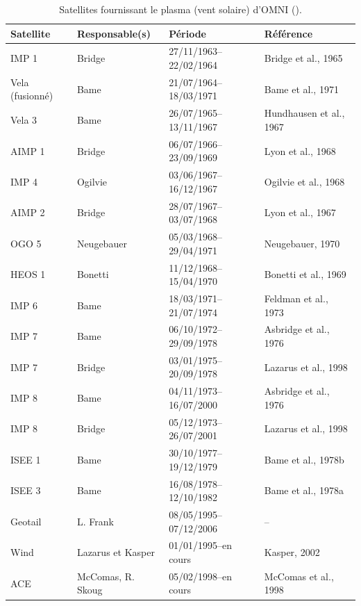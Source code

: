 \begin{table}[ht]
\centering
\footnotesize
\setlength{\tabcolsep}{4pt}
\begin{tabular}{llll}
\hline
\textbf{Satellite} & \textbf{Responsable(s)} & \textbf{Période} & \textbf{Référence} \\
\hline
IMP 1 & Bridge & 27/11/1963--22/02/1964 & Bridge et al., 1965 \\
Vela (fusionné) & Bame & 21/07/1964--18/03/1971 & Bame et al., 1971 \\
Vela 3 & Bame & 26/07/1965--13/11/1967 & Hundhausen et al., 1967 \\
AIMP 1 & Bridge & 06/07/1966--23/09/1969 & Lyon et al., 1968 \\
IMP 4 & Ogilvie & 03/06/1967--16/12/1967 & Ogilvie et al., 1968 \\
AIMP 2 & Bridge & 28/07/1967--03/07/1968 & Lyon et al., 1967 \\
OGO 5 & Neugebauer & 05/03/1968--29/04/1971 & Neugebauer, 1970 \\
HEOS 1 & Bonetti & 11/12/1968--15/04/1970 & Bonetti et al., 1969 \\
IMP 6 & Bame & 18/03/1971--21/07/1974 & Feldman et al., 1973 \\
IMP 7 & Bame & 06/10/1972--29/09/1978 & Asbridge et al., 1976 \\
IMP 7 & Bridge & 03/01/1975--20/09/1978 & Lazarus et al., 1998 \\
IMP 8 & Bame & 04/11/1973--16/07/2000 & Asbridge et al., 1976 \\
IMP 8 & Bridge & 05/12/1973--26/07/2001 & Lazarus et al., 1998 \\
ISEE 1 & Bame & 30/10/1977--19/12/1979 & Bame et al., 1978b \\
ISEE 3 & Bame & 16/08/1978--12/10/1982 & Bame et al., 1978a \\
Geotail & L. Frank & 08/05/1995--07/12/2006 & -- \\
Wind & Lazarus et Kasper & 01/01/1995--en cours & Kasper, 2002 \\
ACE & McComas, R. Skoug & 05/02/1998--en cours & McComas et al., 1998 \\
\hline
\end{tabular}
\caption{Satellites fournissant le plasma (vent solaire) d'OMNI (\cite{SPDF_OMNIWeb}).}
\label{tab:omni_plasma}
\end{table}




